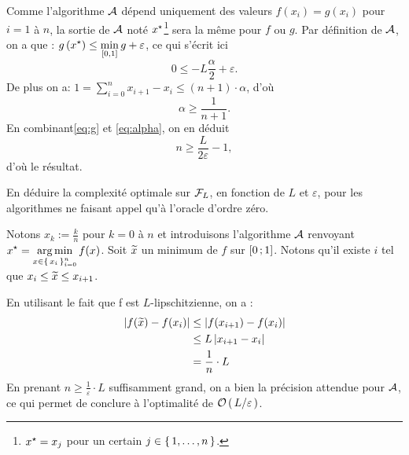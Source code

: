 \begin{chap}
\begin{rep}
  Comme l'algorithme $\mathcal{A}$ dépend uniquement des valeurs $f(x_i)=g(x_i)$ pour $i=1$ à $n$,
  la sortie de $\mathcal{A}$ noté $\xopt$\footnote{$\xopt=x_{j}$ pour un certain $j\in \left \{ \, 1,\ldots,n \, \right \}$.}  sera la même pour $f$ ou $g$. Par définition de $\mathcal{A}$, on a que :
   $ \displaystyle g \left( \xopt \right) \leq \min _ { [ 0,1 ] } g + \varepsilon$,
 ce qui s'écrit ici
 \begin{equation}\label{eq:g}
   0 \leq -L \frac{\alpha}{2} + \varepsilon.
 \end{equation}
   De plus on a: $ 1= \sum_{i=0}^n x_{i+1}-x_i \leq (n+1) \cdot \alpha$,
   d'où
\begin{equation}\label{eq:alpha}
\alpha \geq \frac{1}{n+1}.
\end{equation}
   En combinant\eqref{eq:g} et \eqref{eq:alpha}, on en déduit
   \begin{equation}
     n \geq \frac{L}{2 \varepsilon}-1,
   \end{equation}
   d'où le résultat.
\end{rep}


\begin{qst}
En déduire la complexité optimale sur $\mathcal { F } _ { L }$, en fonction de $L$ et $\varepsilon$, pour les algorithmes ne faisant appel qu’à l’oracle d’ordre zéro.
\end{qst}

\begin{rep}

Notons $x_k := \frac{k}{n}$ pour $k=0$ à $n$ et introduisons l'algorithme $\mathcal{A}$
 renvoyant $\displaystyle \xopt = \argmin_{x \in \acc{x_i}_{i=0}^n} f(x)$.
 Soit $\widetilde{x}$ un minimum de $f$ sur $\mathopen{[}0\mathpunct{};1\mathclose{]}$. Notons qu'il existe $i$ tel
  que $ x_i \leq \widetilde{x} \leq x_{i+1}$.

  En utilisant le fait que f est $L$-lipschitzienne, on a :
  \begin{align*}
    \abs{f(\xtilde)-f(x_i)} &\leq \abs{f(x_{i+1})-f(x_i)}\\
    &\leq L \abs{x_{i+1}-x_i}\\
    &= \frac{1}{n} \cdot L
  \end{align*}
  En prenant $n\geq \frac{1}{\varepsilon}\cdot L$ suffisamment grand, on a bien
la précision attendue pour $\mathcal{A}$, ce qui permet de conclure à l'optimalité de $\mathcal{O}\left( \, L/\varepsilon \, \right)$.
\end{rep}

\end{chap}

